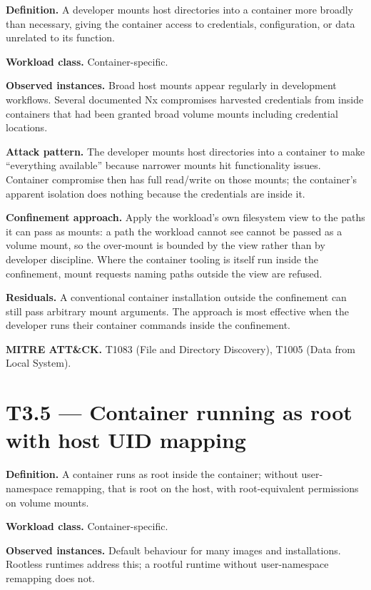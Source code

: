 \textbf{Definition.} A developer mounts host directories into a
container more broadly than necessary, giving the container access to
credentials, configuration, or data unrelated to its function.

\textbf{Workload class.} Container-specific.

\textbf{Observed instances.} Broad host mounts appear regularly in
development workflows. Several documented Nx compromises harvested
credentials from inside containers that had been granted broad volume
mounts including credential locations.

\textbf{Attack pattern.} The developer mounts host directories into a
container to make ``everything available'' because narrower mounts hit
functionality issues. Container compromise then has full read/write on
those mounts; the container's apparent isolation does nothing because
the credentials are inside it.

\textbf{Confinement approach.} Apply the workload's own filesystem view
to the paths it can pass as mounts: a path the workload cannot see
cannot be passed as a volume mount, so the over-mount is bounded by the
view rather than by developer discipline. Where the container tooling is
itself run inside the confinement, mount requests naming paths outside
the view are refused.

\textbf{Residuals.} A conventional container installation outside the
confinement can still pass arbitrary mount arguments. The approach is
most effective when the developer runs their container commands inside
the confinement.

\textbf{MITRE ATT\&CK.} T1083 (File and Directory Discovery), T1005
(Data from Local System).

\hypertarget{t3.5-container-running-as-root-with-host-uid-mapping}{%
\section{T3.5 --- Container running as root with host UID
mapping}\label{t3.5-container-running-as-root-with-host-uid-mapping}}

\textbf{Definition.} A container runs as root inside the container;
without user-namespace remapping, that is root on the host, with
root-equivalent permissions on volume mounts.

\textbf{Workload class.} Container-specific.

\textbf{Observed instances.} Default behaviour for many images and
installations. Rootless runtimes address this; a rootful runtime without
user-namespace remapping does not.

